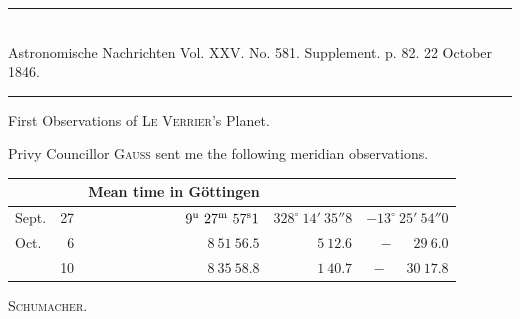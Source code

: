 \clearpage
{}
\hypertarget{native-476-planet}{}
\begin{center}
\rule{0.55\linewidth}{0.4pt}\\[2pt]
Astronomische Nachrichten Vol. XXV. No. 581. Supplement. p. 82. 22 October 1846.\\[2pt]
\rule{0.55\linewidth}{0.4pt}
\end{center}

\begin{center}First Observations of \textsc{Le Verrier}’s Planet.\end{center}

Privy Councillor \textsc{Gauss} sent me the following meridian observations.

\begin{center}
\setlength{\tabcolsep}{5pt}
\begin{tabular}{lr|r|r|r}
\multicolumn{2}{l|}{} & Mean time in Göttingen & & \\
\hline
Sept. & 27 & $9^{\rm u}\ 27^{\rm m}\ 57^{\rm s}1$ & $328^\circ\ 14'\ 35''8$ & $-13^\circ\ 25'\ 54''0$ \\
Oct. & 6 & $8\ 51\ 56.5$ & $5\ 12.6$ & $-\phantom{13^\circ\ }29\ 6.0$ \\
 & 10 & $8\ 35\ 58.8$ & $1\ 40.7$ & $-\phantom{13^\circ\ }30\ 17.8$ \\
\end{tabular}
\end{center}
\begin{flushright}\textsc{Schumacher}.\end{flushright}


